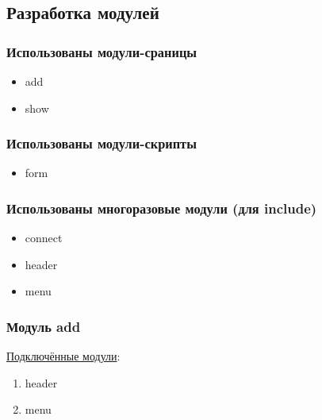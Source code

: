 \newpage


\subsection{Разработка модулей}



\subsubsection*{Использованы модули-сраницы}

\begin{itemize}
    \item add
    \item show
\end{itemize}



\subsubsection*{Использованы модули-скрипты}

\begin{itemize}
    \item form
\end{itemize}



\subsubsection*{Использованы многоразовые модули (для include)}

\begin{itemize}
    \item connect
    \item header
    \item menu
\end{itemize}



\subsubsection*{Модуль add}

\underline{Подключённые модули}:

\begin{enumerate}
    \item header
    \item menu
\end{enumerate}

